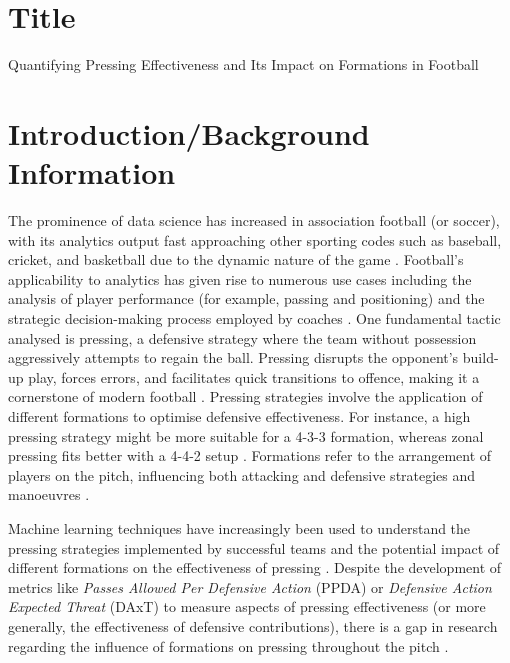 \documentclass[12pt]{article}
\begin{document}
\tableofcontents
\pagebreak
\section{Title}
Quantifying Pressing Effectiveness and Its Impact on Formations in Football

\section{Introduction/Background Information}

The prominence of data science has increased in association football (or soccer), with its analytics output fast approaching other sporting codes such as baseball, cricket, and basketball due to the dynamic nature of the game \citep{decroos_soccer_2020}. Football's applicability to analytics has given rise to numerous use cases including the analysis of player performance (for example, passing and positioning) and the strategic decision-making process employed by coaches \citep{cotton_how_2022, goes_unlocking_2021}. One fundamental tactic analysed is pressing, a defensive strategy where the team without possession aggressively attempts to regain the ball. Pressing disrupts the opponent's build-up play, forces errors, and facilitates quick transitions to offence, making it a cornerstone of modern football \citep{chambers_toby_different_2022, morgan_will_how_2018}. Pressing strategies involve the application of different formations to optimise defensive effectiveness. For instance, a high pressing strategy might be more suitable for a 4-3-3 formation, whereas zonal pressing fits better with a 4-4-2 setup \citep{coaches_voice_4-3-3_2022}. Formations refer to the arrangement of players on the pitch, influencing both attacking and defensive strategies and manoeuvres \citep{bauer_putting_2023}. 

Machine learning techniques have increasingly been used to understand the pressing strategies implemented by successful teams and the potential impact of different formations on the effectiveness of pressing \citep{rico-gonzalez_markel_machine_2023, bauer_data-driven_2021}. Despite the development of metrics like \textit{Passes Allowed Per Defensive Action} (PPDA) or \textit{Defensive Action Expected Threat} (DAxT) to measure aspects of pressing effectiveness (or more generally, the effectiveness of defensive contributions), there is a gap in research regarding the influence of formations on pressing throughout the pitch \citep{bauer_data-driven_2021, rico-gonzalez_markel_machine_2023}. 
\end{document}
